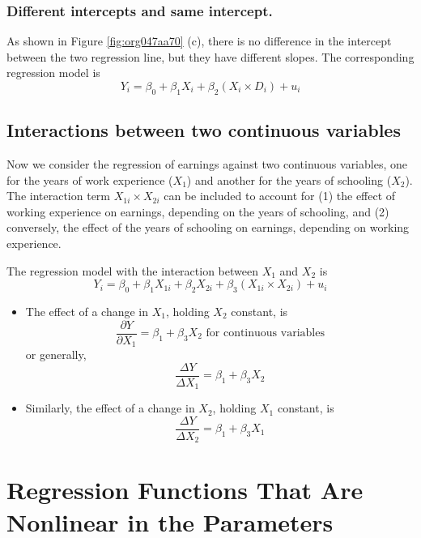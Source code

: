 \documentclass[a4paper,11pt]{article}
\begin{document}
\subsubsection*{Different intercepts and same intercept.}
\label{sec:orgeee91ab}
As shown in Figure \ref{fig:org047aa70} (c), there is no difference in the
intercept between the two regression line, but they have different
slopes. The corresponding regression model is
\begin{equation}
\label{eq:interact-dx-c}
Y_i = \beta_0 + \beta_1 X_i + \beta_2 (X_i \times D_i) + u_i
\end{equation}

\subsection{Interactions between two continuous variables}
\label{sec:orga2902c5}
Now we consider the regression of earnings against two continuous
variables, one for the years of work experience (\(X_1\)) and another
for the years of schooling (\(X_2\)). The interaction term \(X_{1i}
\times X_{2i}\) can be included to account for (1) the effect of
working experience on earnings, depending on the years of schooling,
and (2) conversely, the effect of the years of schooling on earnings,
depending on working experience.

The regression model with the interaction between \(X_1\) and \(X_2\) is
\begin{equation}
\label{eq:interact-xx}
Y_i = \beta_0 + \beta_1 X_{1i} + \beta_2 X_{2i} + \beta_3 (X_{1i} \times X_{2i}) + u_i
\end{equation}

\begin{itemize}
\item The effect of a change in \(X_1\), holding \(X_2\) constant, is
\[ \frac{\partial Y}{\partial X_1} = \beta_1 + \beta_3 X_2 \text{ for
  continuous variables} \]
or generally,
\[ \frac{\Delta Y}{\Delta X_1} = \beta_1 + \beta_3 X_2 \]
\item Similarly, the effect of a change in \(X_2\), holding \(X_1\) constant, is
\[ \frac{\Delta Y}{\Delta X_2} = \beta_1 + \beta_3 X_1 \]
\end{itemize}

\section{Regression Functions That Are Nonlinear in the Parameters}
\label{sec:org7000f5b}
\end{document}
